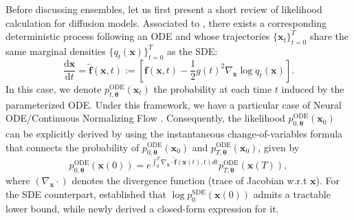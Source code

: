 \documentclass[10pt]{article} %
\def\vtheta{{\bm{\theta}}}
\begin{document}
Before discussing ensembles, let us first present a short review of likelihood calculation for diffusion models. Associated to , there exists a corresponding deterministic process following an ODE and whose trajectories $\{\mathbf{x}_t\}_{t=0}^T$ share the same marginal densities $\{q_t(\mathbf{x})\}_{t=0}^T$ as the SDE:
\begin{equation}\label{eq: backward ODE}
	\frac{\mathrm{d}\mathbf{x}}{\mathrm{d}t} = \mathbf{\tilde{f}}(\mathbf{x},t) := \left[ \mathbf{f}(\mathbf{x},t) - \frac{1}{2} g(t)^2 \nabla_\mathbf{x} \log q_t(\mathbf{x}) \right].
\end{equation}
In this case, we denote $p_{t,\vtheta}^{\text{ODE}}(\mathbf{x}_t)$ the probability at each time $t$ induced by the parameterized ODE. Under this framework, we have a particular case of Neural ODE/Continuous Normalizing Flow \citep{chen2018neural}. Consequently, the likelihood $p_{0,\bm{\theta}}^{\text{ODE}}(\mathbf{x}_0)$ can be explicitly derived by using the instantaneous change-of-variables formula that connects the probability of $p_{0,\bm{\theta}}^{\text{ODE}}(\mathbf{x}_0)$ and $p_{T,\bm{\theta}}^{\text{ODE}}(\mathbf{x}_0)$, given by
\begin{equation}\label{eq: change of variable formula}
p_{0,\bm{\theta}}^{\text{ODE}} (\mathbf{x}(0)) = e^{\int_0^T \nabla_{\mathbf{x}} \cdot \mathbf{\tilde{f}}(\mathbf{x}(t), t) d t} p_{T,\bm{\theta}}^{\text{ODE}}(\mathbf{x}(T)),
\end{equation}
where $(\nabla_\mathbf{x} \cdot)$ denotes the divergence function (trace of Jacobian w.r.t $\mathbf{x}$). For the SDE counterpart, \citet{song2021maximum} established that $\log p_0^{\text{SDE}}(\mathbf{x}(0))$ admits a tractable lower bound, while \citet{albergo2023stochastic} newly derived a closed-form expression for it.
\end{document}

